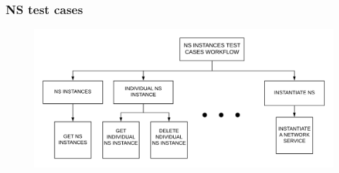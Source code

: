 \begin{frame}
\frametitle{NS test cases}

\begin{figure}
	\centering
	\includegraphics[width=0.9\linewidth]{images/NSLCM}
	\label{fig:nslcm}
\end{figure}

\end{frame}


